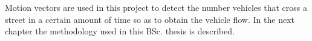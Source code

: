 Motion vectors are used in this project to detect the number vehicles that cross a street in a certain amount of time so as to obtain the vehicle flow. In the next chapter the methodology used in this \ac{BSc.} thesis is described.





